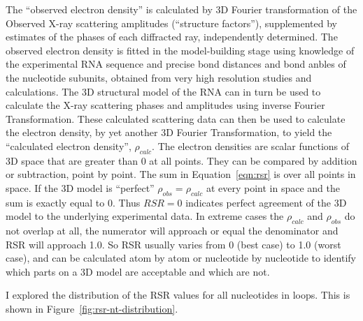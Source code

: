 The ``observed electron density'' is calculated by 3D Fourier transformation of
the Observed X-ray scattering amplitudes (``structure factors''), supplemented
by estimates of the phases of each diffracted ray, independently determined. The
observed electron density is fitted in the model-building stage using knowledge
of the experimental RNA sequence and precise bond distances and bond anbles of
the nucleotide subunits, obtained from very high resolution studies and
calculations. The 3D structural model of the RNA can in turn be used to
calculate the X-ray scattering phases and amplitudes using inverse Fourier
Transformation. These calculated scattering data can then be used to calculate
the electron density, by yet another 3D Fourier Transformation, to yield the
``calculated electron density'', $\rho_{calc}$. The electron densities are
scalar functions of 3D space that are greater than 0 at all points. They can be
compared by addition or subtraction, point by point. The sum in
Equation~\ref{eqn:rsr} is over all points in space. If the 3D model is
``perfect'' $\rho_{obs} = \rho_{calc}$ at every point in space and the sum is
exactly equal to 0. Thus $RSR = 0$ indicates perfect agreement of the 3D model
to the underlying experimental data. In extreme cases the $\rho_{calc}$ and
$\rho_{obs}$ do not overlap at all, the numerator will approach or equal the
denominator and RSR will approach 1.0. So RSR usually varies from 0 (best case)
to 1.0 (worst case), and can be calculated atom by atom or nucleotide by
nucleotide to identify which parts on a 3D model are acceptable and which are
not.

I explored the distribution of the RSR values for all nucleotides in loops. This
is shown in Figure~\ref{fig:rsr-nt-distribution}.

